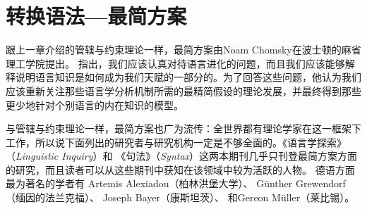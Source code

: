 \chapter{转换语法—最简方案}
\label{Abschnitt-MP}\label{chap-mp}\label{chapter-minimalism}\label{chapter-mp}

跟上一章介绍的管辖与约束理论一样，最简方案由Noam Chomsky在波士顿的麻省理工学院提出。 \citet{Chomsky93b-u,Chomsky95a-u}指出，我们应该认真对待语言进化的问题，而且我们应该能够解释说明语言知识是如何成为我们天赋的一部分的。为了回答这些问题，他认为我们应该重新关注那些语言学分析机制所需的最精简假设的理论发展，并最终得到那些更少地针对个别语言的内在知识的模型。

与管辖与约束理论一样，最简方案也广为流传：全世界都有理论学家在这一框架下工作，所以说下面列出的研究者与研究机构一定是不够全面的。《语言学探索》 （\emph{Linguistic Inquiry}）和 《句法》（\emph{Syntax}）这两本期刊几乎只刊登最简方案方面的研究，而且读者可以从这些期刊中获知在该领域中较为活跃的人物。
德语方面最为著名的学者有
Artemis Alexiadou（柏林洪堡大学）、
Günther Grewendorf （缅因的法兰克福）、
Joseph Bayer（康斯坦茨）、
和Gereon Müller（莱比锡）。

